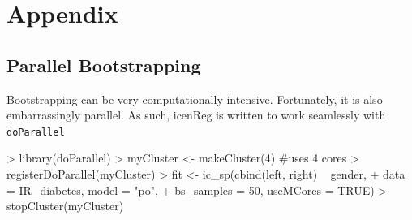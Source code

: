 \documentclass[a4paper]{article}
\begin{document}
  
  

  
  
  
  
  \section{Appendix}
  
  \subsection{Parallel Bootstrapping}
  
 
Bootstrapping can be very computationally intensive. Fortunately, it is also embarrassingly parallel. As such, icenReg is written to work seamlessly with \texttt{doParallel}
  
\begin{Schunk}
\begin{Sinput}
> library(doParallel)
> myCluster <- makeCluster(4)  #uses 4 cores
> registerDoParallel(myCluster)
> fit <- ic_sp(cbind(left, right) ~ gender,
+             data = IR_diabetes, model = "po",
+             bs_samples = 50, useMCores = TRUE)
> stopCluster(myCluster)
\end{Sinput}
\end{Schunk}
  
  
\end{document}
